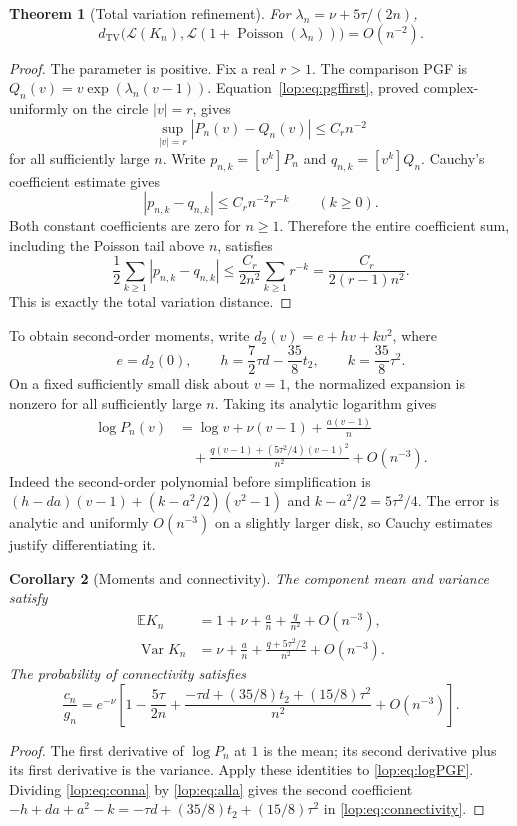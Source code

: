 \documentclass[11pt,letterpaper]{article}
\numberwithin{equation}{section}
\newtheorem{theorem}{Theorem}[section]
\newtheorem{corollary}[theorem]{Corollary}
\theoremstyle{remark}\newtheorem{remark}[theorem]{Remark}
\newcommand{\EE}{\mathbb E}
\newcommand{\Var}{\operatorname{Var}}
\newcommand{\Pois}{\operatorname{Poisson}}
\newcommand{\TV}{d_{\mathrm{TV}}}
\begin{document}
\begin{theorem}[Total variation refinement]\label{lop:thm:TV}
For $\lambda_n=\nu+5\tau/(2n)$,
\[
 \TV\bigl(\mathcal L(K_n),\mathcal L(1+\Pois(\lambda_n))\bigr)
 =O(n^{-2}).
\]
\end{theorem}
\begin{proof}
The parameter is positive. Fix a real $r>1$. The comparison PGF is
$Q_n(v)=v\exp(\lambda_n(v-1))$. Equation~\eqref{lop:eq:pgffirst}, proved
complex-uniformly on the circle $|v|=r$, gives
\[
 \sup_{|v|=r}|P_n(v)-Q_n(v)|\leq C_r n^{-2}
\]
for all sufficiently large $n$. Write $p_{n,k}=[v^k]P_n$ and
$q_{n,k}=[v^k]Q_n$. Cauchy's coefficient estimate gives
\[
 |p_{n,k}-q_{n,k}|\leq C_r n^{-2}r^{-k}\qquad(k\geq0).
\]
Both constant coefficients are zero for $n\geq1$. Therefore the entire
coefficient sum, including the Poisson tail above $n$, satisfies
\[
 \frac12\sum_{k\geq1}|p_{n,k}-q_{n,k}|
 \leq\frac{C_r}{2n^2}\sum_{k\geq1}r^{-k}
 =\frac{C_r}{2(r-1)n^2}.
\]
This is exactly the total variation distance.
\end{proof}

To obtain second-order moments, write
$d_2(v)=e+hv+kv^2$, where
\[
 e=d_2(0),\qquad h=\frac72\tau d-\frac{35}8t_2,
 \qquad k=\frac{35}8\tau^2.
\]
On a fixed sufficiently small disk about $v=1$, the normalized expansion
is nonzero for all sufficiently large $n$. Taking its analytic logarithm
gives
\begin{align}
 \log P_n(v)
 &=\log v+\nu(v-1)+\frac{a(v-1)}n \nonumber\\
 &\quad+\frac{q(v-1)+(5\tau^2/4)(v-1)^2}{n^2}+O(n^{-3}).
 \label{lop:eq:logPGF}
\end{align}
Indeed the second-order polynomial before simplification is
$(h-da)(v-1)+(k-a^2/2)(v^2-1)$ and
$k-a^2/2=5\tau^2/4$.
The error is analytic and uniformly $O(n^{-3})$ on a slightly larger
disk, so Cauchy estimates justify differentiating it.

\begin{corollary}[Moments and connectivity]\label{lop:cor:moments}
The component mean and variance satisfy
\begin{align}
 \EE K_n&=1+\nu+\frac an+\frac q{n^2}+O(n^{-3}),\label{lop:eq:mean}\\
 \Var K_n&=\nu+\frac an+
           \frac{q+5\tau^2/2}{n^2}+O(n^{-3}).\label{lop:eq:variance}
\end{align}
The probability of connectivity satisfies
\begin{equation}\label{lop:eq:connectivity}
 \frac{c_n}{g_n}=e^{-\nu}\left[
 1-\frac{5\tau}{2n}
 +\frac{-\tau d+(35/8)t_2+(15/8)\tau^2}{n^2}
 +O(n^{-3})\right].
\end{equation}
\end{corollary}
\begin{proof}
The first derivative of $\log P_n$ at $1$ is the mean; its second
derivative plus its first derivative is the variance. Apply these
identities to \eqref{lop:eq:logPGF}. Dividing \eqref{lop:eq:conna} by
\eqref{lop:eq:alla} gives the second coefficient
$-h+da+a^2-k=-\tau d+(35/8)t_2+(15/8)\tau^2$ in
\eqref{lop:eq:connectivity}.
\end{proof}
\end{document}
